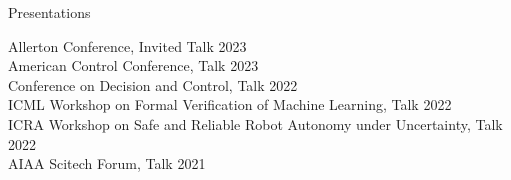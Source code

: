 \begin{rSection}{Presentations}
    
    Allerton Conference, Invited Talk \hfill {2023}\\
    American Control Conference, Talk \hfill {2023}\\
    Conference on Decision and Control, Talk \hfill {2022}\\
    ICML Workshop on Formal Verification of Machine Learning, Talk \hfill {2022}\\
    ICRA Workshop on Safe and Reliable Robot Autonomy under Uncertainty, Talk \hfill {2022}\\
    AIAA Scitech Forum, Talk \hfill {2021}\\

\end{rSection}